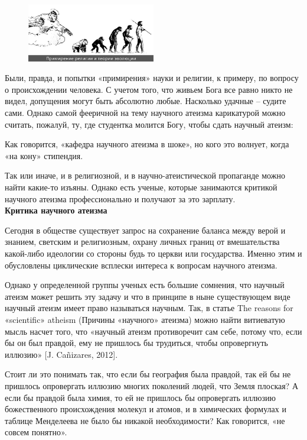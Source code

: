 \begin{figure}
    \includegraphics[width=0.5\textwidth]{img/atheism-monkey.jpg}
\end{figure}
Были, правда, и попытки «примирения» науки и религии, к примеру, по вопросу о происхождении человека. С учетом того, что живьем Бога все равно никто не видел, допущения могут быть абсолютно любые. Насколько удачные – судите сами.
Однако самой фееричной на тему научного атеизма карикатурой можно считать, пожалуй, ту, где студентка молится Богу, чтобы сдать научный атеизм:

Как говорится, «кафедра научного атеизма в шоке», но кого это волнует, когда «на кону» стипендия.

Так или иначе, и в религиозной, и в научно-атеистической пропаганде можно найти какие-то изъяны. Однако есть ученые, которые занимаются критикой научного атеизма профессионально и получают за это зарплату.\\


\textbf{Критика научного атеизма}

Сегодня в обществе существует запрос на сохранение баланса между верой и знанием, светским и религиозным, охрану личных границ от вмешательства какой-либо идеологии со стороны будь то церкви или государства. Именно этим и обусловлены циклические всплески интереса к вопросам научного атеизма.

Однако у определенной группы ученых есть большие сомнения, что научный атеизм может решить эту задачу и что в принципе в ныне существующем виде научный атеизм имеет право называться научным. Так, в статье The reasons for «scientific» atheism (Причины «научного» атеизма) можно найти витиеватую мысль насчет того, что «научный атеизм противоречит сам себе, потому что, если бы он был правдой, ему не пришлось бы трудиться, чтобы опровергнуть иллюзию» [J. Cañizares, 2012].

Стоит ли это понимать так, что если бы география была правдой, так ей бы не пришлось опровергать иллюзию многих поколений людей, что Земля плоская? А если бы правдой была химия, то ей не пришлось бы опровергать иллюзию божественного происхождения молекул и атомов, и в химических формулах и таблице Менделеева не было бы никакой необходимости? Как говорится, «не совсем понятно».


